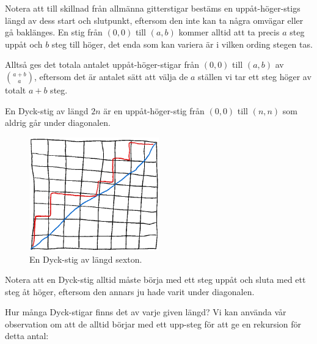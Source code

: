\documentclass[nobib]{tufte-handout}
\begin{document}
Notera att till skillnad från allmänna gitterstigar bestäms en uppåt-höger-stigs längd av dess start och slutpunkt, eftersom den inte kan ta några omvägar eller gå baklänges. En stig från $(0,0)$ till $(a,b)$ kommer alltid att ta precis $a$ steg uppåt och $b$ steg till höger, det enda som kan variera är i vilken ording stegen tas.

Alltså ges det totala antalet uppåt-höger-stigar från $(0,0)$ till $(a,b)$ av $\binom{a+b}{a}$, eftersom det är antalet sätt att välja de $a$ ställen vi tar ett steg höger av totalt $a+b$ steg.

\begin{definition}
    En Dyck-stig av längd $2n$ är en uppåt-höger-stig från $(0,0)$ till $(n,n)$ som aldrig går under diagonalen.
    \begin{figure}
        \centering
        \includegraphics*[width=0.5\textwidth]{graphics/Dyck_path.png}
        \caption{En Dyck-stig av längd sexton.}
    \end{figure}
\end{definition}

Notera att en Dyck-stig alltid måste börja med ett steg uppåt och sluta med ett steg åt höger, eftersom den annars ju hade varit under diagonalen.

Hur många Dyck-stigar finns det av varje given längd? Vi kan använda vår observation om att de alltid börjar med ett upp-steg för att ge en rekursion för detta antal:
\end{document}
